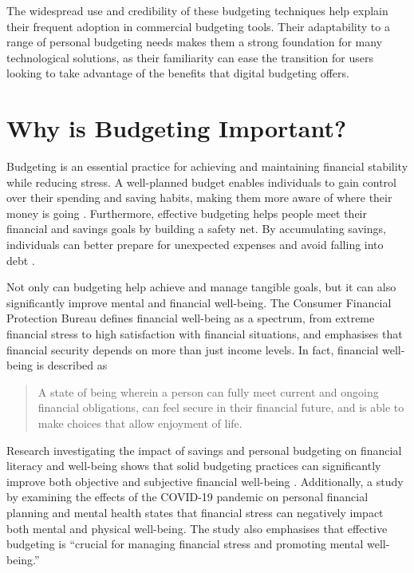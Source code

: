 \documentclass{l4proj}
\begin{document}
The widespread use and credibility of these budgeting techniques help explain their frequent adoption in commercial budgeting tools. Their adaptability to a range of personal budgeting needs makes them a strong foundation for many technological solutions, as their familiarity can ease the transition for users looking to take advantage of the benefits that digital budgeting offers.

\section{Why is Budgeting Important?}
Budgeting is an essential practice for achieving and maintaining financial stability while reducing stress. A well-planned budget enables individuals to gain control over their spending and saving habits, making them more aware of where their money is going \citep{lake_budgets_2022}. Furthermore, effective budgeting helps people meet their financial and savings goals by building a safety net. By accumulating savings, individuals can better prepare for unexpected expenses and avoid falling into debt \citep{ganti_what_2024}.

Not only can budgeting help achieve and manage tangible goals, but it can also significantly improve mental and financial well-being. The Consumer Financial Protection Bureau defines financial well-being as a spectrum, from extreme financial stress to high satisfaction with financial situations, and emphasises that financial security depends on more than just income levels. In fact, financial well-being is described as
\begin{quote}
     A state of being wherein a person can fully meet current and ongoing financial obligations, can feel secure in their financial future, and is able to make choices that allow enjoyment of life.
\end{quote} \citep{noauthor_financial_2015}

Research investigating the impact of savings and personal budgeting on financial literacy and well-being shows that solid budgeting practices can significantly improve both objective and subjective financial well-being \citep{versal_how_2023}. Additionally, a study by \citet{shukri_personal_2024} examining the effects of the COVID-19 pandemic on personal financial planning and mental health states that financial stress can negatively impact both mental and physical well-being. The study also emphasises that effective budgeting is “crucial for managing financial stress and promoting mental well-being.”
\end{document}
